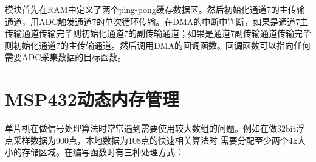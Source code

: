 模块首先在RAM中定义了两个ping-pong缓存数据区。然后初始化通道7的主传输通道，用ADC触发通道7的单次循环传输。在DMA的中断中判断，如果是通道7主传输通道传输完毕则初始化通道7的副传输通道；如果是通道7副传输通道传输完毕则初始化通道7的主传输通道。然后调用DMA的回调函数。回调函数可以指向任何需要ADC采集数据的目标函数。
%		
%		
%		
%		
%

\section{MSP432动态内存管理}
	单片机在做信号处理算法时常常遇到需要使用较大数组的问题。例如在做32bit浮点采样数据为900点，本地数据为108点的快速相关算法时
需要分配至少两个4k大小的存储区域。在编写函数时有三种处理方式：

